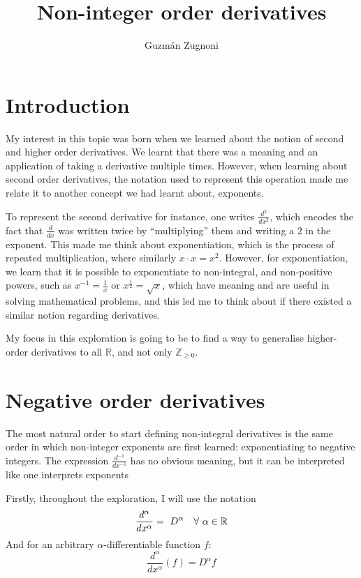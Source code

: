 \documentclass{article}
\author{Guzmán Zugnoni}
\title{Non-integer order derivatives}
\renewcommand{\maketitle}{
\begin{center}
	\Huge\textbf \thetitle
\end{center}
}
\def\squad{\hskip2\fontdimen3\font}
\begin{document}
\maketitle

\newpage

\tableofcontents

\newpage

\section{Introduction}

My interest in this topic was born when we learned about the notion of second
and higher order derivatives. We learnt that there was a meaning and an
application of taking a derivative multiple times. However, when learning about
second order derivatives, the notation used to represent this operation made
me relate it to another concept we had learnt about, exponents.

To represent the second derivative for instance, one writes $\frac{d^2}{dx^2}$,
which encodes the fact that $\frac{d}{dx}$ was written twice by ``multiplying''
them and writing a $2$ in the exponent. This made me think about
exponentiation, which is the process of repeated multiplication, where
similarly $x \cdot x = x^2$. However, for exponentiation, we learn that it is
possible to exponentiate to non-integral, and non-positive powers, such as
$x^{-1}=\frac{1}{x}$ or $x^\frac{1}{2} = \sqrt{x}$, which have meaning and are
useful in solving mathematical problems, and this led me to think about if
there existed a similar notion regarding derivatives.

My focus in this exploration is going to be to find a way to generalise
higher-order derivatives to all $\mathbb{R}$, and not only $\mathbb{Z}_{\geq0}$.

\section{Negative order derivatives}

The most natural order to start defining non-integral derivatives is the same
order in which non-integer exponents are first learned: exponentiating to
negative integers. The expression $\frac{d^{-1}}{dx^{-1}}$ has no obvious
meaning, but it can be interpreted like one interprets exponents

Firstly, throughout the exploration, I will use the notation
$$  \frac{d^\alpha}{dx^\alpha}=\
	D^\alpha \quad \forall \squad \alpha \in \mathbb{R}$$
And for an arbitrary $\alpha$-differentiable function $f$:
$$\frac{d^\alpha}{dx^\alpha}\left(f\right) = D^\alpha f$$
\end{document}
